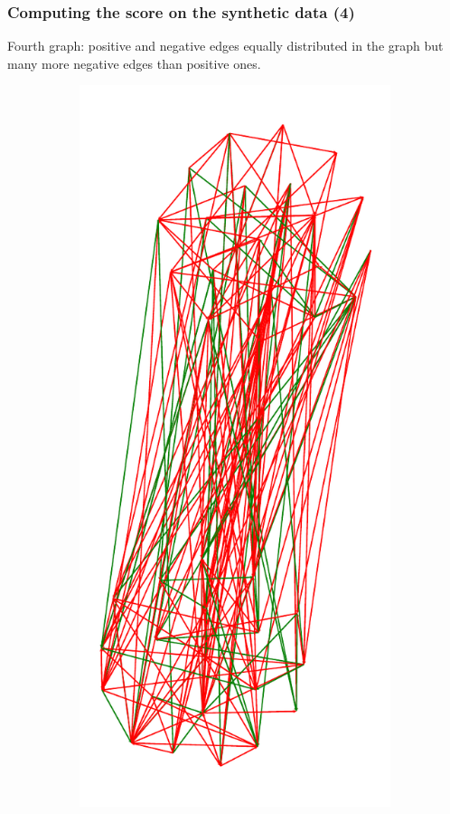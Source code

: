 \documentclass{beamer}
\begin{document}
\begin{frame}[c]
	\frametitle{Computing the score on the synthetic data (4)}
	Fourth graph: positive and negative edges equally distributed in the
	graph but many more negative edges than positive ones.

	\begin{figure}
		\begin{center}
			\begin{subfigure}[b]{0.2\textwidth}
				\centering
				\includegraphics[width=\textwidth]{out/synthetic/graph4.pdf}

\end{subfigure}
\end{center}
\end{figure}
\end{frame}
\end{document}
